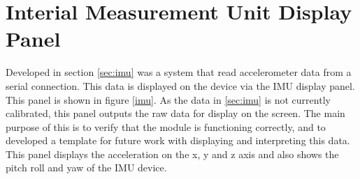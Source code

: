 

\section{Interial Measurement Unit Display Panel}

Developed in section \ref{sec:imu} was a system that read accelerometer data from a serial connection. This data is displayed on the device via the IMU display panel. This panel is shown in figure \ref{imu}. As the data in \ref{sec:imu} is not currently calibrated, this panel outputs the raw data for display on the screen. The main purpose of this is to verify that the module is functioning correctly, and to developed a template for future work with displaying and interpreting this data. This panel displays the acceleration on the x, y and z axis and also shows the pitch roll and yaw of the IMU device.






